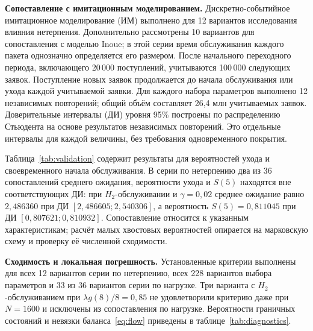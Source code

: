 \noindent\textbf{Сопоставление с имитационным моделированием.}
Дискретно-событийное имитационное моделирование (ИМ) выполнено для 12 вариантов исследования влияния нетерпения. Дополнительно рассмотрены 10 вариантов для сопоставления с моделью Inoue; в этой серии время обслуживания каждого пакета однозначно определяется его размером. После начального переходного периода, включающего 20\,000 поступлений, учитываются 100\,000 следующих заявок. Поступление новых заявок продолжается до начала обслуживания или ухода каждой учитываемой заявки. Для каждого набора параметров выполнено 12 независимых повторений; общий объём составляет 26,4 млн учитываемых заявок. Доверительные интервалы (ДИ) уровня 95\% построены по распределению Стьюдента на основе результатов независимых повторений. Это отдельные интервалы для каждой величины, без требования одновременного покрытия.

Таблица~\ref{tab:validation} содержит результаты для вероятностей ухода и своевременного начала обслуживания. В серии по нетерпению два из 36 сопоставлений среднего ожидания, вероятности ухода и $S(5)$ находятся вне соответствующих ДИ: при $H_2$-обслуживании и $\gamma=0{,}02$ среднее ожидание равно $2{,}486360$ при ДИ $[2{,}486605;2{,}540306]$, а вероятность $S(5)=0{,}811045$ при ДИ $[0{,}807621;0{,}810932]$. Сопоставление относится к указанным характеристикам; расчёт малых хвостовых вероятностей опирается на марковскую схему и проверку её численной сходимости.

\begin{table}[htbp]\centering\small
\caption{Расчёт вероятностей и ИМ при $\lambda=0{,}8$, $a=2$, $b=8$, $g(i)=0{,}1438i+1{,}8874$, $c_v(H_2)=1{,}5$: 12 повторений по 100\,000 учитываемых заявок, доверительные интервалы уровня 95\%}\label{tab:validation}

\end{table}

\noindent\textbf{Сходимость и локальная погрешность.}
Установленные критерии выполнены для всех 12 вариантов серии по нетерпению, всех 228 вариантов выбора параметров и 33 из 36 вариантов серии по нагрузке. Три варианта с $H_2$-обслуживанием при $\lambda g(8)/8=0{,}85$ не удовлетворили критерию даже при $N=1600$ и исключены из сопоставления по нагрузке. Вероятности граничных состояний и невязки баланса~\eqref{eq:flow} приведены в таблице~\ref{tab:diagnostics}.

\begin{table}[htbp]\centering\small
\caption{Проверка стационарного расчёта для вариантов, удовлетворивших критерию сходимости: вероятность граничных состояний и невязка баланса ухода}\label{tab:diagnostics}

\end{table}

